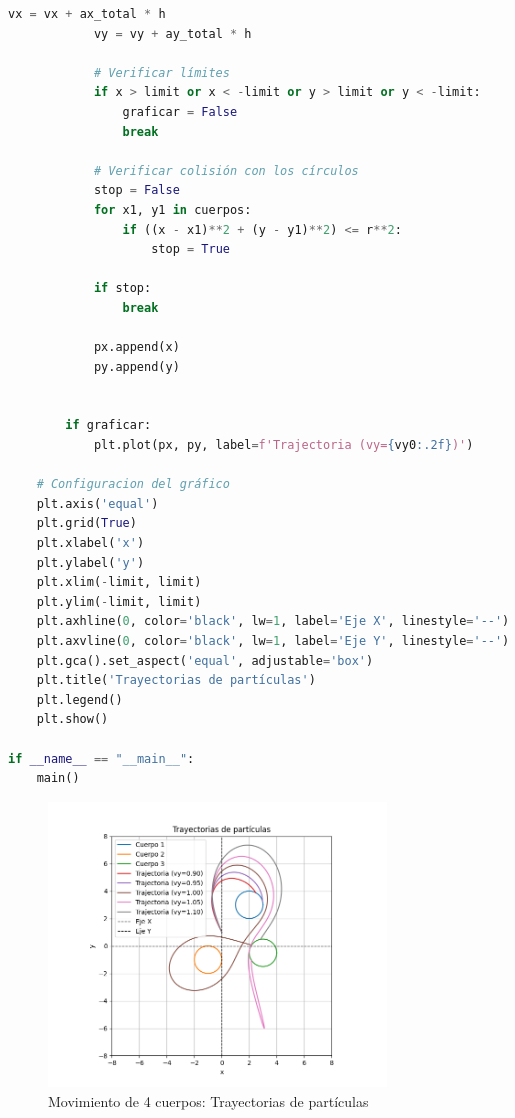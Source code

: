 \documentclass{article}
\begin{document}
\begin{center}
\begin{lstlisting}[language=Python, caption={Sistema completo de 4 cuerpos con análisis dinámico}]
            vx = vx + ax_total * h
            vy = vy + ay_total * h

            # Verificar límites
            if x > limit or x < -limit or y > limit or y < -limit:
                graficar = False
                break

            # Verificar colisión con los círculos
            stop = False
            for x1, y1 in cuerpos:
                if ((x - x1)**2 + (y - y1)**2) <= r**2:
                    stop = True

            if stop:
                break

            px.append(x)
            py.append(y)


        if graficar:
            plt.plot(px, py, label=f'Trajectoria (vy={vy0:.2f})')

    # Configuracion del gráfico
    plt.axis('equal')
    plt.grid(True)
    plt.xlabel('x')
    plt.ylabel('y')
    plt.xlim(-limit, limit)
    plt.ylim(-limit, limit)
    plt.axhline(0, color='black', lw=1, label='Eje X', linestyle='--')
    plt.axvline(0, color='black', lw=1, label='Eje Y', linestyle='--')
    plt.gca().set_aspect('equal', adjustable='box')
    plt.title('Trayectorias de partículas')
    plt.legend()
    plt.show()

if __name__ == "__main__":
    main()
	\end{lstlisting}

	\begin{figure}[H]
    \centering
    \includegraphics[width=0.8\textwidth]{img/4.png}
    \caption{Movimiento de 4 cuerpos: Trayectorias de partículas}
    \label{fig:salida_consola}
\end{figure}
    

\end{center}
\end{document}
